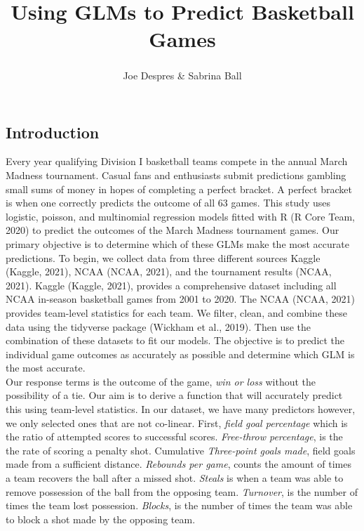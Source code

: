 \documentclass[
  man,floatsintext]{apa6}
\title{Using GLMs to Predict Basketball Games}
\author{Joe Despres\textsuperscript{} \& Sabrina Ball\textsuperscript{}}
\date{}
\affiliation{\vspace{0.5cm}\textsuperscript{} Michigan State University}
\begin{document}
\maketitle

\hypertarget{introduction}{%
\subsection{Introduction}\label{introduction}}

Every year qualifying Division I basketball teams compete in the annual March Madness tournament. Casual fans and enthusiasts submit predictions gambling small sums of money in hopes of completing a perfect bracket. A perfect bracket is when one correctly predicts the outcome of all 63 games. This study uses logistic, poisson, and multinomial regression models fitted with R (R Core Team, 2020) to predict the outcomes of the March Madness tournament games. Our primary objective is to determine which of these GLMs make the most accurate predictions. To begin, we collect data from three different sources Kaggle (Kaggle, 2021), NCAA (NCAA, 2021), and the tournament results (NCAA, 2021). Kaggle (Kaggle, 2021), provides a comprehensive dataset including all NCAA in-season basketball games from 2001 to 2020. The NCAA (NCAA, 2021) provides team-level statistics for each team. We filter, clean, and combine these data using the tidyverse package (Wickham et al., 2019). Then use the combination of these datasets to fit our models. The objective is to predict the individual game outcomes as accurately as possible and determine which GLM is the most accurate.\\
Our response terms is the outcome of the game, \emph{win or loss} without the possibility of a tie. Our aim is to derive a function that will accurately predict this using team-level statistics. In our dataset, we have many predictors however, we only selected ones that are not co-linear. First, \emph{field goal percentage} which is the ratio of attempted scores to successful scores. \emph{Free-throw percentage}, is the the rate of scoring a penalty shot. Cumulative \emph{Three-point goals made}, field goals made from a sufficient distance. \emph{Rebounds per game}, counts the amount of times a team recovers the ball after a missed shot. \emph{Steals} is when a team was able to remove possession of the ball from the opposing team. \emph{Turnover}, is the number of times the team lost possession. \emph{Blocks}, is the number of times the team was able to block a shot made by the opposing team.\\
\end{document}
